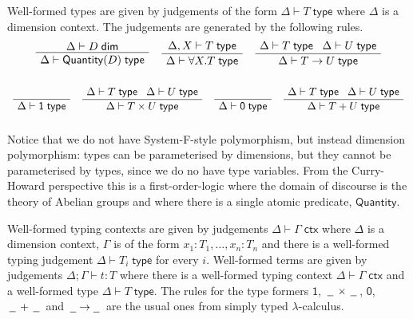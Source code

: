 \documentclass[a4paper,UKenglish]{lipics}
\theoremstyle{plain}
\newcommand{\ra}{\rightarrow}
\newcommand{\msf}[1]{\mathsf{#1}} %
\newcommand{\blank}{\, \underline{\hspace{2mm}} \,}
\newcommand{\unitTy}{\msf{1}}
\newcommand{\emptyTy}{\msf{0}}
\newcommand{\qnt}{\msf{Quantity}}
\newcommand{\cj}[2]{#1 \vdash #2 \; \msf{ ctx}}
\newcommand{\Tj}[2]{#1 \vdash #2 \; \msf{ type}}
\newcommand{\Dj}[2]{#1 \vdash #2 \; \msf{ dim}}
\newcommand{\tj}[4]{#1;#2 \vdash #3 : #4}
\newcommand{\Dim}{D}
\newcommand{\Dvar}{X}
\begin{document}
\vspace{3mm}  Well-formed types are given by judgements of the form $\Tj\Delta  T$ where
$\Delta$ is a dimension context. The judgements are generated by the following rules.
\[\begin{array}{c}
\AxiomC{$\Dj\Delta \Dim$}
		\UnaryInfC{$\Tj\Delta {\qnt(\Dim)}$}
		\DisplayProof

\hspace{4mm}
\AxiomC{$\Tj {\Delta, \Dvar}  T$}
	\UnaryInfC{$\Tj \Delta{ \forall \Dvar.T} $}
	\DisplayProof
\hspace{4mm}
\AxiomC{$\Delta \vdash T \; \msf{ type} \; \; \; \Delta \vdash U \; \msf{ type}$}
	\UnaryInfC{$\Delta \vdash T \rightarrow U  \; \msf{ type}$}
	\DisplayProof
\\ \\
\end{array}\]
\[ \begin{array}{c}
\AxiomC{  $\phantom{\vdash T \; \msf{ type}}$ }
		\UnaryInfC{$\Delta \vdash \unitTy \; \msf{ type}$}
	\DisplayProof
\hspace{4mm}
\AxiomC{$\Delta \vdash T \; \msf{ type} \; \; \; \Delta \vdash U \; \msf{ type}$}
	\UnaryInfC{$\Delta \vdash T\times U \; \msf{ type}$}
	\DisplayProof
\hspace{4mm}
\AxiomC{  $\phantom{ \vdash T \; \msf{ type}}$ }
		\UnaryInfC{$\Delta \vdash \emptyTy \; \msf{ type}$}
	\DisplayProof
\hspace{4mm}
\AxiomC{$\Delta \vdash T \; \msf{ type} \; \; \; \Delta \vdash U \; \msf{ type}$}
	\UnaryInfC{$\Delta \vdash T + U \; \msf{ type}$}
	\DisplayProof
\\ \\
\end{array}\]
Notice that we do not have System-F-style polymorphism, but instead dimension polymorphism: types can be parameterised by dimensions, but they cannot be parameterised by types, since we do no have type variables. From the Curry-Howard perspective this is a first-order-logic where the domain of discourse is the theory of Abelian groups and where there is a single atomic predicate, $\qnt$.

\vspace{3mm}  Well-formed typing contexts are given by judgements
$\cj\Delta\Gamma $ where $\Delta$ is a dimension context, $\Gamma$ is
of the form ${x_1 : T_1, \ldots, x_n:T_n}$ and there is a well-formed
typing judgement $\Tj\Delta{ T_i}$ for every $i$. Well-formed terms
are given by judgements $\tj \Delta \Gamma t T$ where there is a
well-formed typing context $\cj \Delta \Gamma$ and
a well-formed type $\Tj \Delta T $. The rules for
the type formers $\unitTy$, $\blank\times\blank$, $\emptyTy$, $\blank+\blank$ and $\blank \! \ra \! \blank$ are the usual ones from
simply typed $\lambda$-calculus.
\end{document}

